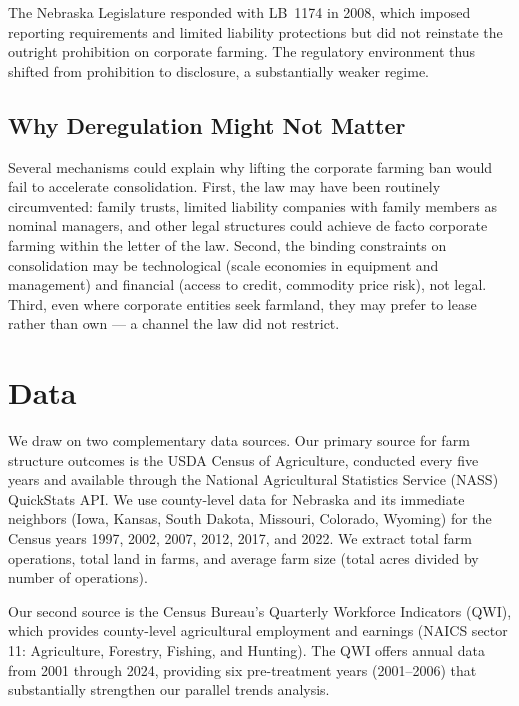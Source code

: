 \documentclass[12pt]{article}
\begin{document}
The Nebraska Legislature responded with LB~1174 in 2008, which imposed reporting requirements and limited liability protections but did not reinstate the outright prohibition on corporate farming. The regulatory environment thus shifted from prohibition to disclosure, a substantially weaker regime.

\subsection{Why Deregulation Might Not Matter}

Several mechanisms could explain why lifting the corporate farming ban would fail to accelerate consolidation. First, the law may have been routinely circumvented: family trusts, limited liability companies with family members as nominal managers, and other legal structures could achieve de facto corporate farming within the letter of the law. Second, the binding constraints on consolidation may be technological (scale economies in equipment and management) and financial (access to credit, commodity price risk), not legal. Third, even where corporate entities seek farmland, they may prefer to lease rather than own --- a channel the law did not restrict.

\section{Data}\label{sec:data}

We draw on two complementary data sources. Our primary source for farm structure outcomes is the USDA Census of Agriculture, conducted every five years and available through the National Agricultural Statistics Service (NASS) QuickStats API. We use county-level data for Nebraska and its immediate neighbors (Iowa, Kansas, South Dakota, Missouri, Colorado, Wyoming) for the Census years 1997, 2002, 2007, 2012, 2017, and 2022. We extract total farm operations, total land in farms, and average farm size (total acres divided by number of operations).

Our second source is the Census Bureau's Quarterly Workforce Indicators (QWI), which provides county-level agricultural employment and earnings (NAICS sector 11: Agriculture, Forestry, Fishing, and Hunting). The QWI offers annual data from 2001 through 2024, providing six pre-treatment years (2001--2006) that substantially strengthen our parallel trends analysis.
\end{document}
